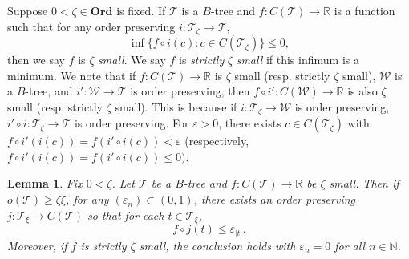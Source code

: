 \documentclass[12pt]{amsart}
\newtheorem{lemma}[theorem]{Lemma}
\theoremstyle{definition}
\newcommand{\ord}{\textbf{Ord}}
\newcommand{\rr}{\mathbb{R}}
\newcommand{\nn}{\mathbb{N}}
\newcommand{\ttt}{\mathcal{T}}
\newcommand{\www}{\mathcal{W}}
\begin{document}
Suppose $0<\zeta\in \ord$ is fixed.  If $\ttt$ is a $B$-tree and $f:C(\ttt)\to \rr$ is a function such that for any order preserving $i:\ttt_\zeta\to \ttt$, $$\inf \{f\circ i(c): c\in C(\ttt_\zeta)\}\leqslant 0,$$ then we say $f$ is $\zeta$ \emph{small}. We say $f$ is \emph{strictly} $\zeta$ \emph{small} if this infimum is a minimum.  We note that if $f:C(\ttt)\to \rr$ is $\zeta$ small (resp. strictly $\zeta$ small), $\www$ is a $B$-tree, and $i':\www\to \ttt$ is order preserving, then $f\circ i':C(\www)\to \rr$ is also $\zeta$ small (resp. strictly $\zeta$ small).  This is because if $i:\ttt_\zeta\to \www$ is order preserving, $i'\circ i:\ttt_\zeta\to \ttt$ is order preserving.  For $\varepsilon>0$, there exists $c\in C(\ttt_\zeta)$ with $f\circ i'(i(c))=f(i'\circ i(c))<\varepsilon$ (respectively, $f\circ i'(i(c))=f(i'\circ i(c))\leqslant 0)$.  

\begin{lemma} Fix $0<\zeta$.  Let $\ttt$ be a $B$-tree and $f:C(\ttt)\to \rr$ be $\zeta$ small.  Then if $o(\ttt)\geqslant \zeta\xi$, for any $(\varepsilon_n)\subset (0,1)$, there exists an order preserving $j:\ttt_\xi\to C(\ttt)$ so that for each $t\in \ttt_\xi$, $$f\circ j(t)\leqslant \varepsilon_{|t|}.$$  
Moreover, if $f$ is strictly $\zeta$ small, the conclusion holds with $\varepsilon_n=0$ for all $n\in \nn$.  



\label{local coloring}

\end{lemma}
\end{document}
